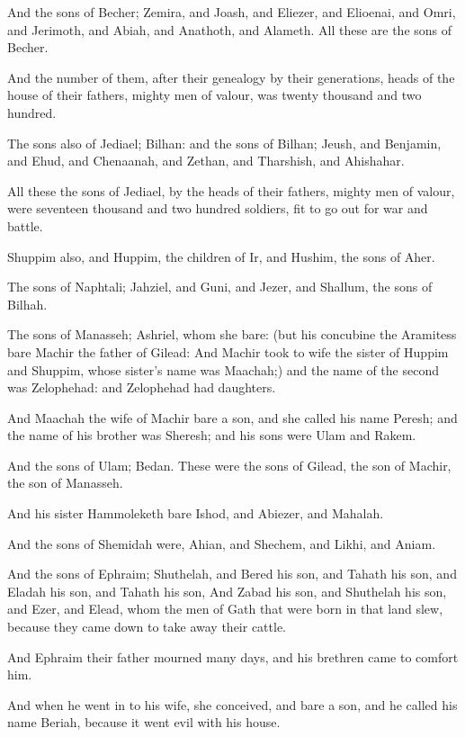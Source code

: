 \verse And the sons of Becher; Zemira, and Joash, and Eliezer, and Elioenai, and Omri, and Jerimoth, and Abiah, and Anathoth, and Alameth. All these are the sons of Becher.

\verse And the number of them, after their genealogy by their generations, heads of the house of their fathers, mighty men of valour, was twenty thousand and two hundred.

\verse The sons also of Jediael; Bilhan: and the sons of Bilhan; Jeush, and Benjamin, and Ehud, and Chenaanah, and Zethan, and Tharshish, and Ahishahar.

\verse All these the sons of Jediael, by the heads of their fathers, mighty men of valour, were seventeen thousand and two hundred soldiers, fit to go out for war and battle.

\verse Shuppim also, and Huppim, the children of Ir, and Hushim, the sons of Aher.

\verse The sons of Naphtali; Jahziel, and Guni, and Jezer, and Shallum, the sons of Bilhah.

\verse The sons of Manasseh; Ashriel, whom she bare: (but his concubine the Aramitess bare Machir the father of Gilead: \verse And Machir took to wife the sister of Huppim and Shuppim, whose sister's name was Maachah;) and the name of the second was Zelophehad: and Zelophehad had daughters.

\verse And Maachah the wife of Machir bare a son, and she called his name Peresh; and the name of his brother was Sheresh; and his sons were Ulam and Rakem.

\verse And the sons of Ulam; Bedan. These were the sons of Gilead, the son of Machir, the son of Manasseh.

\verse And his sister Hammoleketh bare Ishod, and Abiezer, and Mahalah.

\verse And the sons of Shemidah were, Ahian, and Shechem, and Likhi, and Aniam.

\verse And the sons of Ephraim; Shuthelah, and Bered his son, and Tahath his son, and Eladah his son, and Tahath his son, \verse And Zabad his son, and Shuthelah his son, and Ezer, and Elead, whom the men of Gath that were born in that land slew, because they came down to take away their cattle.

\verse And Ephraim their father mourned many days, and his brethren came to comfort him.

\verse And when he went in to his wife, she conceived, and bare a son, and he called his name Beriah, because it went evil with his house.

